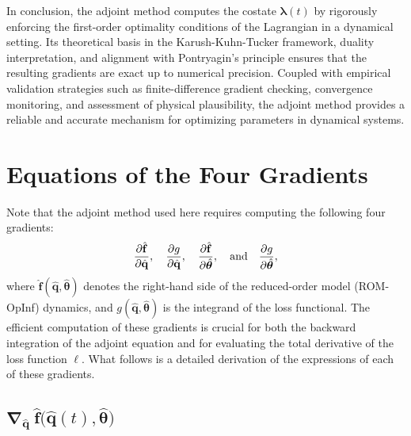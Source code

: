 In conclusion, the adjoint method computes the costate $\bm{\lambda}(t)$ by rigorously enforcing the first-order optimality conditions of the Lagrangian in a dynamical setting. Its theoretical basis in the Karush-Kuhn-Tucker framework, duality interpretation, and alignment with Pontryagin's principle ensures that the resulting gradients are exact up to numerical precision. Coupled with empirical validation strategies such as finite-difference gradient checking, convergence monitoring, and assessment of physical plausibility, the adjoint method provides a reliable and accurate mechanism for optimizing parameters in dynamical systems.


\section{Equations of the Four Gradients}
\label{sec:four_gradients}

Note that the adjoint method used here requires computing the following four gradients:\\
$$\pdv{\hat{\mathbf{f}}}{\hat{\mathbf{q}}},  \quad \pdv{g}{\hat{\mathbf{q}}}, \quad \pdv{\hat{\mathbf{f}}}{\hat{\bm{\theta}}},\quad \text{and} \quad \pdv{g}{\hat{\bm{\theta}}},$$
where $\hat{\mathbf{f}}(\hat{\mathbf{q}}, \hat{\bm{\theta}})$ denotes the right-hand side of the reduced-order model (ROM-OpInf) dynamics, and $g(\hat{\mathbf{q}}, \hat{\bm{\theta}})$ is the integrand of the loss functional. The efficient computation of these gradients is crucial for both the backward integration of the adjoint equation and for evaluating the total derivative of the loss function $\ell$. What follows is a detailed derivation of the expressions of each of these gradients.

\subsection{$\bm{\nabla}_{\hat{\mathbf{q}}}~\hat{\mathbf{f}}\bigl(\hat{\mathbf{q}}(t), \hat{\bm{\theta}}\bigr)$}

